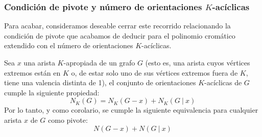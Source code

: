 \documentclass{article}
\numberwithin{figure}{section}
\begin{document}
\subsubsection{Condición de pivote y número de orientaciones $K$-acíclicas}
    Para acabar, consideramos deseable cerrar este recorrido relacionando la condición de pivote que acabamos de deducir para el polinomio cromático extendido con el número de orientaciones $K$-acíclicas.
    
    Sea $x$ una arista $K$-apropiada de un grafo $G$ (esto es, una arista cuyos vértices extremos están en $K$ o, de estar solo uno de sus vértices extremos fuera de $K$, tiene una valencia distinta de 1), el conjunto de orientaciones $K$-acíclicas de $G$ cumple la siguiente propiedad:
    \begin{equation*}
        N_K(G) = N_K(G - x) + N_K(G\ |\ x)
    \end{equation*}
    Por lo tanto, y como corolario, se cumple la siguiente equivalencia para cualquier arista $x$ de $G$ como pivote:
    \begin{equation*}
        N(G - x) + N(G\ |\ x)
    \end{equation*}

\printbibliography[title={Bibliografía}]
\end{document}

